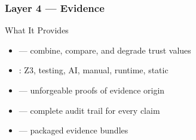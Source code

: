 \begin{frame}
\frametitle{Layer 4 --- Evidence}
\begin{block}{What It Provides}
  \begin{itemize}
    \item {} --- combine, compare, and degrade trust values
    \item {}: Z3, testing, AI, manual, runtime, static
    \item {} --- unforgeable proofs of evidence origin
    \item {} --- complete audit trail for every claim
    \item {} --- packaged evidence bundles
  \end{itemize}
\end{block}
\vfill
\begin{center}
\end{center}
\end{frame}

